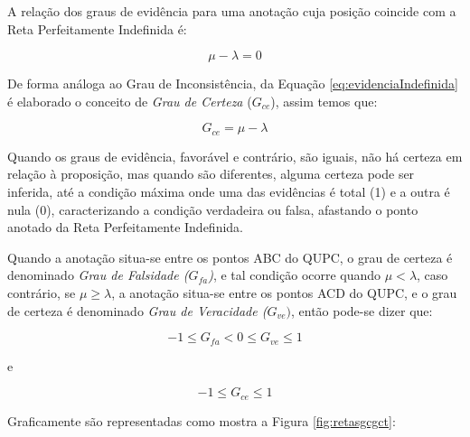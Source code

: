A relação dos graus de evidência para uma anotação cuja posição coincide com a Reta Perfeitamente Indefinida é: 

\begin{center}
\begin{equation}
\mu - \lambda = 0
\label{eq:evidenciaIndefinida}
\end{equation}
\end{center}

De forma análoga ao Grau de Inconsistência, da Equação \ref{eq:evidenciaIndefinida} é elaborado o conceito de \emph{Grau de Certeza} ($G_{ce}$), assim temos que: 


\begin{center}
\begin{equation}
G _{ce} = \mu - \lambda
\label{eq:grauCerteza}
\end{equation}
\end{center}

Quando os graus de evidência, favorável e contrário, são iguais, não há certeza em relação à proposição, mas quando são diferentes, alguma certeza pode ser inferida, até a condição máxima onde uma das evidências é total (1) e a outra é nula (0), caracterizando a condição verdadeira ou falsa, afastando o ponto anotado da Reta Perfeitamente Indefinida. 

Quando a anotação situa-se entre os pontos ABC do QUPC, o grau de certeza é denominado \emph{Grau de Falsidade ($G _{fa}$)}, e tal condição ocorre quando $\mu < \lambda $, caso contrário, se $\mu \ge \lambda $, a anotação situa-se entre os pontos ACD do QUPC, e o grau de certeza é denominado \emph{Grau de Veracidade ($G _{ve})$}, então pode-se dizer que:


\begin{center}
\begin{equation}
-1 \le G_{fa}  <  0 \le G_{ve} \le 1
\label{eq:grauVerdadeFalsidade}
\end{equation}
\end{center}
e
\begin{center}
\begin{equation}
-1 \le G_{ce} \le 1
\label{eq:grauCertezaIntervalo}
\end{equation}
\end{center}

Graficamente são representadas como mostra a Figura \ref{fig:retasgcgct}:

